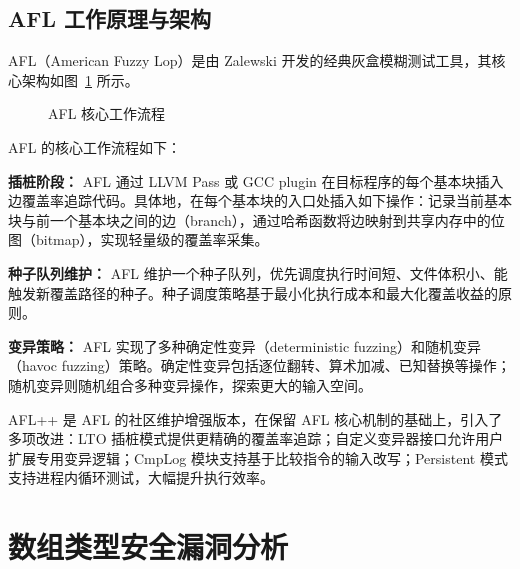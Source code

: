 \documentclass[bachelor]{njupthesis}
\begin{document}
\subsection{AFL 工作原理与架构}

AFL（American Fuzzy Lop）是由 Zalewski 开发的经典灰盒模糊测试工具\cite{AFL}，其核心架构如图~\ref{fig:afl_arch} 所示。

\begin{figure}[hbt]
\centering
{}
\caption{AFL 核心工作流程}
\label{fig:afl_arch}
\end{figure}

AFL 的核心工作流程如下：

\textbf{插桩阶段：} AFL 通过 LLVM Pass 或 GCC plugin 在目标程序的每个基本块插入边覆盖率追踪代码。具体地，在每个基本块的入口处插入如下操作：记录当前基本块与前一个基本块之间的边（branch），通过哈希函数将边映射到共享内存中的位图（bitmap），实现轻量级的覆盖率采集。

\textbf{种子队列维护：} AFL 维护一个种子队列，优先调度执行时间短、文件体积小、能触发新覆盖路径的种子。种子调度策略基于最小化执行成本和最大化覆盖收益的原则。

\textbf{变异策略：} AFL 实现了多种确定性变异（deterministic fuzzing）和随机变异（havoc fuzzing）策略。确定性变异包括逐位翻转、算术加减、已知替换等操作；随机变异则随机组合多种变异操作，探索更大的输入空间。

AFL++\cite{AFLPLUSPLUS} 是 AFL 的社区维护增强版本，在保留 AFL 核心机制的基础上，引入了多项改进：LTO 插桩模式提供更精确的覆盖率追踪；自定义变异器接口允许用户扩展专用变异逻辑；CmpLog 模块支持基于比较指令的输入改写；Persistent 模式支持进程内循环测试，大幅提升执行效率。

\section{数组类型安全漏洞分析}
\end{document}
